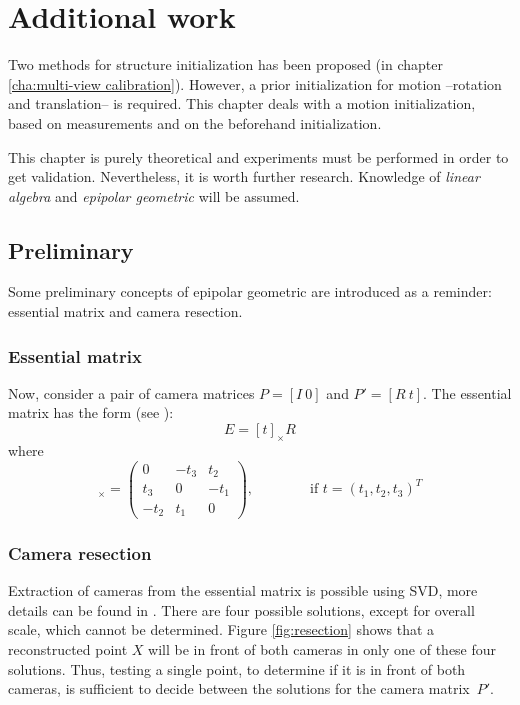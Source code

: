 \chapter{Additional work}
\label{cha:additional}

Two methods for structure initialization has been proposed (in chapter \ref{cha:multi-view calibration}). However, a prior initialization for motion --rotation and translation-- is required. This chapter deals with a motion initialization, based on measurements and on the beforehand initialization.

This chapter is purely theoretical and experiments must be performed in order to get validation. Nevertheless, it is worth further research. Knowledge of \textit{linear algebra} and \textit{epipolar geometric} will be assumed. %


\section{Preliminary}

Some preliminary concepts  of epipolar geometric are introduced as a reminder: essential matrix and camera resection.

\subsection{Essential matrix}
Now, consider a pair of camera matrices $P = [I~0]$ and $P' = [R~t]$. The essential matrix has the form (see \cite[p257]{HZ2}):
\begin{equation}
E = [t]_{\times}R
\end{equation}
where
\begin{equation}
[t]_{\times} =
\begin{pmatrix}
      0    & -t_3  &  t_2 \\
      t_3  &  0    & -t_1 \\
     -t_2  &  t_1  &  0
\end{pmatrix},
\quad \quad \quad \quad \mbox{if~} t = (t_1, t_2, t_3)^T
\end{equation}


\subsection{Camera resection}
\label{sec:resection}

Extraction of cameras from the essential matrix is possible using SVD, more details can be found in \cite[p258-260, Result 9.19]{HZ2}. There are four possible solutions, except for overall scale, which
cannot be determined. Figure \ref{fig:resection} shows that a reconstructed point $X$ will be in front of both cameras in only one of these four solutions. Thus, testing a single point, to determine if it is in front of both cameras, is sufficient to decide between the solutions for the camera matrix~$P'$.

